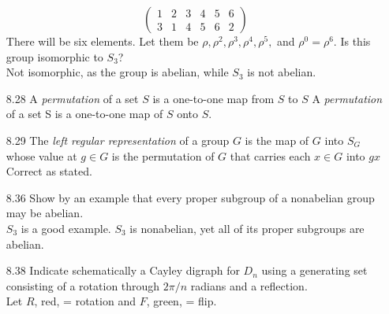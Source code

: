 \documentclass[12pt]{article}
\begin{document}
\begin{enumerate}
\[\begin{pmatrix}
		1 & 2 & 3 & 4 & 5 & 6 \\
		3 & 1 & 4 & 5 & 6 & 2 
		\end{pmatrix} \]
	There will be six elements. Let them be $ \rho, \rho^2, \rho^3, \rho^4, \rho^5,$ and $ \rho^0 = \rho^6 $. Is this group isomorphic to $ S_3 $?\\
	Not isomorphic, as the group is abelian, while $ S_3 $ is not abelian.
	\item[8.28] A \textit{permutation} of a set $ S $ is a one-to-one map from $ S $ to $ S $
		A \textit{permutation} of a set S is a one-to-one map of $S$ onto $S$.
	\item[8.29]The \textit{left regular representation} of a group $ G $ is the map of $ G $ into $ S_G $ whose value at $ g\in G $ is the permutation of $ G $ that carries each $ x\in G $ into $ gx $\\
	Correct as stated.
	\item[8.36] Show by an example that every proper subgroup of a nonabelian group may be abelian.\\
	$ S_3 $ is a good example. $ S_3 $ is nonabelian, yet all of its proper subgroups are abelian.
		
	\item[8.38] Indicate schematically a Cayley digraph for $ D_n $ using a generating set consisting of a rotation through $ 2\pi/n $ radians and a reflection.\\
	Let $ R $, red, = rotation and $ F $, green, = flip.\\
\end{enumerate}
\end{document}
